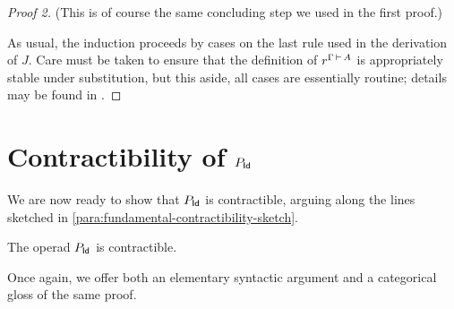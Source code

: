 \begin{proof}[Proof 2]
(This is of course the same concluding step we used in the first proof.)

As usual, the induction proceeds by cases on the last rule used in the derivation of $J$.  Care must be taken to ensure that the definition of $r^{\Gamma \,\vdash\, A}$ is appropriately stable under substitution, but this aside, all cases are essentially routine; details may be found in \cite{lumsdaine:weak-w-cats-from-itt-lmcs}.
\end{proof}






\section{Contractibility of \texorpdfstring{$P_{\mathsf{Id}}$}{P\_Id}}

We are now ready to show that $P_{\mathsf{Id}}$ is contractible, arguing along the lines sketched in \ref{para:fundamental-contractibility-sketch}.

\begin{theorem}\label{thm:p-is-contractible}The operad $P_{\mathsf{Id}}$ is contractible.
\end{theorem}

Once again, we offer both an elementary syntactic argument and a categorical gloss of the same proof.

